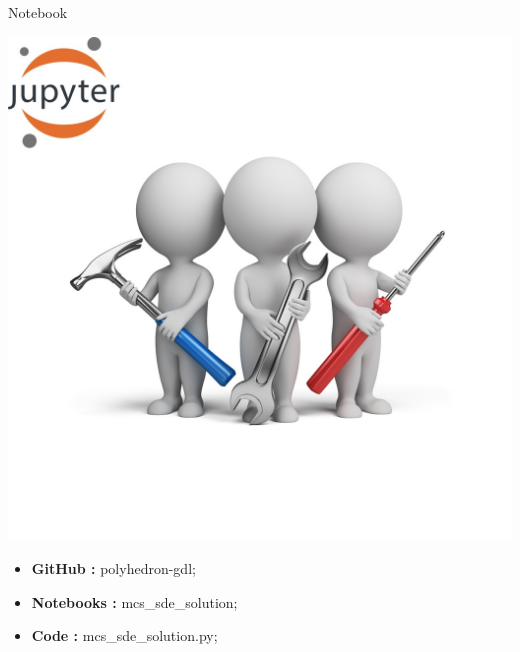 \documentclass[11pt]{beamer}
\begin{document}
\begin{frame}{Notebook}
\noindent\begin{minipage}{0.5\textwidth}%
\includegraphics[width=\linewidth]{img/exercise.jpg}
\end{minipage}%
\hfill%
\begin{minipage}{0.5\textwidth}
\begin{itemize}
\item {\bf GitHub        : }    polyhedron-gdl;
\item {\bf Notebooks  : }    mcs\_sde\_solution;
\item {\bf Code          : }    mcs\_sde\_solution.py;
\end{itemize}
\end{minipage}
\end{frame}
\end{document}
